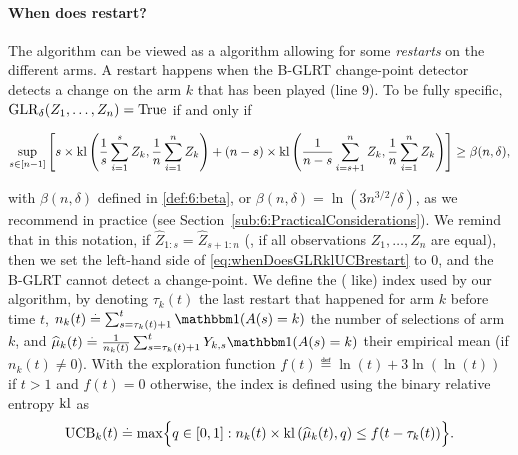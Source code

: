 \paragraph{When does \GLRklUCB{} restart?}

The \GLRklUCB{} algorithm can be viewed as a \klUCB{} algorithm allowing for some \emph{restarts} on the different arms. A restart happens when the B-GLRT change-point detector detects a change on the arm $k$ that has been played (line $9$).
%
To be fully specific, $\mathrm{GLR}_\delta(Z_1,\dots,Z_n) = \mathrm{True}$ if and only if
\begin{small}
    \begin{equation}\label{eq:whenDoesGLRklUCBrestart}
        \sup_{s \in [n-1]} \left[s \times \mathrm{kl} \left(\frac{1}{s}\sum_{i=1}^s Z_k , \frac{1}{n}\sum_{i=1}^n Z_k\right) + (n-s) \times \mathrm{kl} \left(\frac{1}{n-s}\sum_{i=s+1}^n Z_k , \frac{1}{n}\sum_{i=1}^n Z_k\right)\right] \geq \beta(n,\delta),
    \end{equation}
\end{small}
%
with $\beta(n,\delta)$ defined in \eqref{def:6:beta}, or $\beta(n,\delta) = \ln(3n^{3/2}/\delta)$, as we recommend in practice (see Section~\ref{sub:6:PracticalConsiderations}).
We remind that in this notation, if $\widehat{Z}_{1:s}=\widehat{Z}_{s+1:n}$ (\ie, if all observations $Z_1,\dots,Z_n$ are equal), then we set the left-hand side of \eqref{eq:whenDoesGLRklUCBrestart} to $0$, and the B-GLRT cannot detect a change-point.
%
We define the (\klUCB{} like) index used by our algorithm, by denoting
$\tau_k(t)$ the last restart that happened for arm $k$ before time $t$,
$n_k(t) \eqdef \sum_{s=\tau_k(t)+1}^{t} \indic(A(s)=k)$
the number of selections of arm $k$, and
$\widehat{\mu}_k(t) \eqdef \frac{1}{n_k(t)} \sum_{s=\tau_k(t)+1}^{t}Y_{k,s} \indic(A(s)=k)$
their empirical mean (if $n_k(t)\neq0$).
%
With the exploration function $f(t) \eqdef \ln(t) + 3 \ln(\ln(t))$ if $t>1$ and $f(t)=0$ otherwise,
the index is defined using the binary relative entropy $\mathrm{kl}$ as
%
\begin{equation}\label{def:6:UCB}
    \mathrm{UCB}_k(t) \overset{.}{=} \max \Bigl\{ q\in[0,1] : n_k(t) \times \mathrm{kl}\left(\widehat{\mu}_k(t),q\right) \leq f(t - \tau_k(t)) \Bigr\}.
\end{equation}


